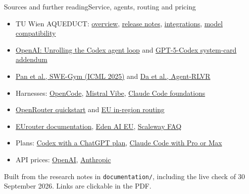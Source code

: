 \documentclass[aspectratio=169]{beamer}
\newcommand{\smallnote}[1]{{\footnotesize\color{ACINgray}#1}}
\begin{document}
\begin{frame}{Sources and further reading}{Service, agents, routing and pricing}
\footnotesize
\begin{itemize}\itemsep4pt
  \item TU Wien AQUEDUCT: \href{https://datalab.tuwien.ac.at/aiml/aqueduct/}{overview}, \href{https://datalab.tuwien.ac.at/aiml/aqueduct/release-notes/}{release notes}, \href{https://datalab.tuwien.ac.at/aiml/aqueduct/integrations/}{integrations}, \href{https://datalab.tuwien.ac.at/aiml/aqueduct/model-compatibility/}{model compatibility}
  \item \href{https://openai.com/index/unrolling-the-codex-agent-loop/}{OpenAI: Unrolling the Codex agent loop} and \href{https://openai.com/index/gpt-5-system-card-addendum-gpt-5-codex/}{GPT-5-Codex system-card addendum}
  \item \href{https://proceedings.mlr.press/v267/pan25g.html}{Pan et al., SWE-Gym (ICML 2025)} and \href{https://arxiv.org/abs/2506.11425}{Da et al., Agent-RLVR}
  \item Harnesses: \href{https://opencode.ai/}{OpenCode}, \href{https://github.com/mistralai/mistral-vibe}{Mistral Vibe}, \href{https://www.anthropic.com/webinars/claude-code-foundations}{Claude Code foundations}
  \item \href{https://openrouter.ai/docs/quickstart}{OpenRouter quickstart} and \href{https://openrouter.ai/docs/guides/get-started/sovereign-ai}{EU in-region routing}
  \item \href{https://www.eurouter.ai/docs}{EUrouter documentation}, \href{https://www.edenai.co/eu}{Eden AI EU}, \href{https://www.scaleway.com/en/docs/generative-apis/faq/}{Scaleway FAQ}
  \item Plans: \href{https://help.openai.com/en/articles/11369540-using-codex-with-your-chatgpt-plan}{Codex with a ChatGPT plan}, \href{https://support.claude.com/en/articles/11145838-use-claude-code-with-your-pro-or-max-plan}{Claude Code with Pro or Max}
  \item API prices: \href{https://developers.openai.com/api/docs/pricing}{OpenAI}, \href{https://www.anthropic.com/pricing}{Anthropic}
\end{itemize}
\vspace{2mm}
\smallnote{Built from the research notes in \texttt{documentation/}, including the live check of 30 September 2026. Links are clickable in the PDF.}
\end{frame}
\end{document}
